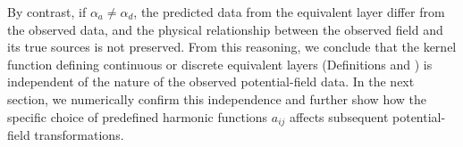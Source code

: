 By contrast, if $\alpha_{a} \ne \alpha_{d}$, the predicted data from the equivalent layer differ from 
the observed data, and the physical relationship between the observed field and its true sources is 
not preserved. From this reasoning, we conclude that the kernel function defining continuous or discrete 
equivalent layers (Definitions  and ) 
is independent of the nature of the observed potential-field data. In the next section, we numerically confirm 
this independence and further show how the specific choice of predefined harmonic functions $a_{ij}$ 
affects subsequent potential-field transformations.
